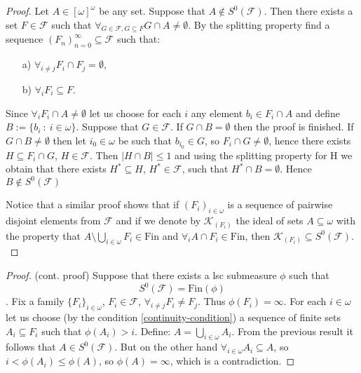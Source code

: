 \documentclass{amsart}
\theoremstyle{definition}
\theoremstyle{definition}
\newcommand{\Fin}{\textrm{Fin}}
\newcommand{\calK}{\mathcal{K}}
\begin{document}
\begin{proof}
Let $A \in [\omega]^\omega$ be any set.
Suppose that $A\notin S^0(\mathcal{F})$. 
Then there exists a set $F\in\mathcal{F}$ such that 
$\forall_ {G \in \mathcal{F}, G\subseteq F} G\cap A \neq \emptyset$. 
By the splitting property find a sequence
$(F_n)_{n=0}^\infty \subseteq\mathcal{F}$ such that:
\begin{itemize}
\item[a)] $\forall_ {i\neq j} F_i\cap F_j = \emptyset$,
\item[b)] $\forall_ {i} F_i \subseteq F$.
\end{itemize}
Since $\forall_ {i} F_i \cap A \neq \emptyset$ let us choose 
for each $i$ any element $b_i \in F_i \cap A$ 
and define 
$B:=\{b_i\ :\ i\in\omega\}$. Suppose that $G\in \mathcal{F}$. 
If $G\cap B=\emptyset$ then the proof is finished. If $G\cap B \neq\emptyset$ then let $i_0\in\omega$ 
be such that $b_{i_0}\in G$, so $F_i\cap G \neq\emptyset$, hence there exists 
$H\subseteq F_i\cap G$, $H\in\mathcal{F}$. Then $|H\cap B|\leq 1$ and using the
splitting property for H we obtain that there exists $H^*\subseteq H$, $H^*\in\mathcal{F}$, 
such that $H^* \cap B=\emptyset$. 
Hence $B\notin S^0(\mathcal{F})$

Notice that 
a similar proof shows that if $(F_i)_{i\in\omega}$ 
is a sequence of pairwise disjoint elements from $\mathcal{F}$ and if we
denote by $\calK_(F_i)$ the ideal of sets $A\subseteq \omega$
with the property that 
$A\setminus \bigcup_{i\in\omega} F_i\in\Fin$ and $\forall_{i} A\cap F_i\in\Fin$, then 
$\calK_{(F_i)}\subseteq S^0(\mathcal{F})$.\\
\end{proof}

\begin{proof} (cont. proof)
Suppose that there exists a lsc submeasure $\phi$ such that
$$S^0(\mathcal{F}) = \Fin(\phi)$$.
Fix a family $\{F_i\}_{i\in\omega}$, $F_i\in\mathcal{F}$, $\forall_{i\neq j} F_i\neq F_j$. 
Thus $\phi(F_i)=\infty$. For each $i\in\omega$ let us choose 
(by the condition \ref{continuity-condition}) 
a sequence of finite sets 
$A_i\subseteq F_i$ such that $\phi(A_i)>i$. Define: $A=\bigcup_{i\in\omega} A_i$. From the previous 
result it follows that $A\in S^0(\mathcal{F})$. 
But on the other hand $\forall_{i\in\omega} A_i \subseteq A$, so $i<\phi(A_i)\leq \phi(A)$, 
so $\phi(A)=\infty$, which is a contradiction.
\end{proof}
\end{document}
